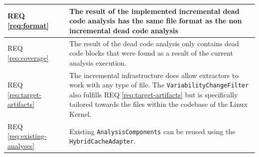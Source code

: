 \documentclass[a4paper]{article}
\newcommand{\cmark}{\ding{51}}%
\begin{document}
\begin{longtable}{ |  L{0.19\textwidth} | C{0.125\textwidth} | L{0.60\textwidth} |}
	REQ \ref{req:format} & \cmark & The result of the implemented incremental dead code analysis has the same file format as the non incremental dead code analysis\\ \hline
	REQ \ref{req:coverage} & \cmark & The result of the dead code analysis only contains dead code blocks that were found as a result of the current analysis execution.\\ \hline
	REQ \ref{req:target-artifacts} & \cmark & The incremental infrastructure does allow extractors to work with any type of file. The \texttt{VariabilityChangeFilter} also fulfills REQ \ref{req:target-artifacts}  but is specifically tailored towards the files within the codebase of the Linux Kernel.\\ \hline
	REQ \ref{req:existing-analyses} & \cmark & Existing \texttt{AnalysisComponents}  can be reused using the \texttt{Hybrid\-Cache\-Adapter}.\\ \hline


	
\end{longtable}
\end{document}
